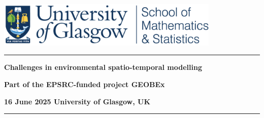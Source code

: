 \documentclass[
  11pt,
  letterpaper,
  DIV=11,
  numbers=noendperiod]{scrartcl}
\author{}
\date{}
\begin{document}
\begin{titlepage}
\centering

\includegraphics[width=0.8\textwidth]{UofGMS_header.png}

\vspace*{4cm}

\noindent\rule{\textwidth}{1pt}
{\Huge \bfseries Challenges in environmental spatio-temporal modelling \par}

{\Large \bfseries Part of the EPSRC-funded project GEOBEx\par}

{\large \bfseries 16 June 2025 University of Glasgow, UK\par}

\noindent\rule{\textwidth}{1pt}
\vspace{1.5cm}






\end{titlepage}
\clearpage
\setcounter{page}{1}
\end{document}
